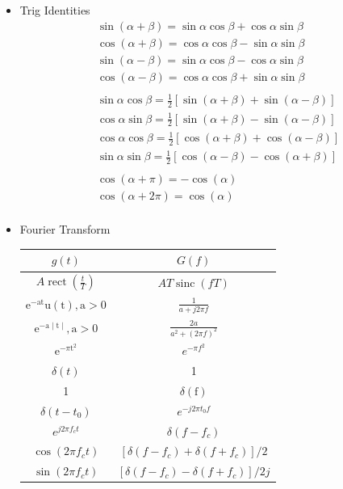 \documentclass[10pt,landscape]{article}
\DeclareMathOperator{\sinc}{sinc}
\begin{document}
\begin{multicols*}{3}
\begin{itemize}
\item Trig Identities \[
\begin{aligned}
    & \sin (\alpha+\beta)=\sin \alpha \cos \beta+\cos \alpha \sin \beta \\
    & \cos (\alpha+\beta)=\cos \alpha \cos \beta-\sin \alpha \sin \beta \\
    & \sin (\alpha-\beta)=\sin \alpha \cos \beta-\cos \alpha \sin \beta \\
    & \cos (\alpha-\beta)=\cos \alpha \cos \beta+\sin \alpha \sin \beta \\ \\
    &  \sin \alpha \cos \beta= \frac{1}{2} [\sin (\alpha+\beta)+\sin (\alpha-\beta)] \\
    & \cos \alpha \sin \beta=\frac{1}{2} [\sin (\alpha+\beta)-\sin (\alpha-\beta)] \\
    & \cos \alpha \cos \beta=\frac{1}{2} [\cos (\alpha+\beta)+\cos (\alpha-\beta)] \\
    & \sin \alpha \sin \beta=\frac{1}{2} [\cos (\alpha-\beta)-\cos (\alpha+\beta)] \\ \\
    & \cos(\alpha + \pi) = -\cos(\alpha) \\ & \cos(\alpha + 2\pi) = \cos(\alpha) \\
\end{aligned}
\]

\item Fourier Transform
\begin{center}
    \begin{tabular}{c|c}
$g(t)$ & $G(f)$  \\ \hline
$A \operatorname{rect}\left(\frac{t}{T}\right)$ & $A T \sinc (f T)$ \\ \hline
$\mathrm{e}^{-\mathrm{at}} \mathrm{u}(\mathrm{t}), \mathrm{a}>0$ & $\frac{1}{a+j 2 \pi f}$ \\ \hline
$\mathrm{e}^{-\mathrm{a} \mid \mathrm{t} \mid}, \mathrm{a}>0$ & $\frac{2 a}{a^2+(2 \pi f)^2}$ \\ \hline
$\mathrm{e}^{-\pi \mathrm{t}^2}$ & $e^{-\pi f^2}$ \\ \hline
$\delta(t)$ & 1 \\ \hline
1 & $\delta(\mathrm{f})$ \\ \hline
$\delta\left(t-t_0\right)$ & $e^{-j 2 \pi t_0 f}$ \\ \hline
$e^{j 2 \pi f_c t}$ & $\delta\left(f-f_c\right)$ \\ \hline
$\cos \left(2 \pi f_c t\right)$ & {$\left[\delta\left(f-f_c\right)+\delta\left(f+f_c\right)\right] / 2$} \\ \hline
$\sin \left(2 \pi f_c t\right)$ & {$\left[\delta\left(f-f_c\right)-\delta\left(f+f_c\right)\right] / 2 j$} \\
\end{tabular}
\end{center}


\end{itemize}
\end{multicols*}
\end{document}
